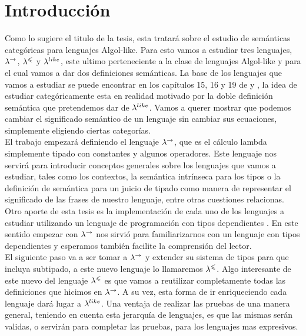 \chapter{Introducci\'on}
\label{chap:intro}

Como lo sugiere el titulo de la tesis, esta tratar\'a sobre el estudio
de sem\'anticas categ\'oricas para lenguajes Algol-like. Para esto
vamos a estudiar tres lenguajes, $\lambda^{\rightarrow}$, $\lambda^{\leqslant}$ y $\lambda^{like}$,
este ultimo perteneciente a la clase de lenguajes Algol-like y para el cual
vamos a dar dos definiciones sem\'anticas.
La base de los lenguajes que vamos a estudiar se puede encontrar en los
cap\'itulos 15, 16 y 19 de \cite{reynolds2009theories} y \cite{olesfunctorcategories}, 
la idea de estudiar
categ\'oricamente esta en realidad motivado por la doble definici\'on
sem\'antica que pretendemos dar de $\lambda^{like}$. Vamos a querer mostrar
que podemos cambiar el significado
sem\'antico de un lenguaje sin cambiar sus ecuaciones, simplemente
eligiendo ciertas categor\'ias.\\

El trabajo empezar\'a definiendo el lenguaje $\lambda^{\rightarrow}$, que es el
c\'alculo lambda simplemente tipado con constantes y algunos operadores.
Este lenguaje nos servir\'a para introducir conceptos generales sobre 
los lenguajes que vamos a estudiar, tales como
los contextos, la sem\'antica intr\'inseca para los tipos o la definici\'on
de sem\'antica para un juicio de tipado como manera de representar el significado
de las frases de nuestro lenguaje, entre otras cuestiones relacionas. 
Otro aporte de esta tesis es la implementaci\'on de cada uno de los lenguajes
a estudiar utilizando un lenguaje de programaci\'on con tipos dependientes 
\cite{idrislanguage}. 
En este sentido empezar con $\lambda^{\rightarrow}$ nos sirvi\'o para
familiarizarnos con un lenguaje con tipos dependientes y esperamos tambi\'en
facilite la comprensi\'on del lector.\\

El siguiente paso va a ser tomar a $\lambda^{\rightarrow}$ y extender su sistema de 
tipos para que incluya subtipado, a este nuevo lenguaje lo llamaremos
$\lambda^{\leqslant}$. Algo interesante de este nuevo del lenguaje $\lambda^{\leqslant}$
es que vamos a reutilizar completamente todas las definiciones que hicimos
en $\lambda^{\rightarrow}$. A su vez, esta forma de ir enriqueciendo cada lenguaje 
dar\'a lugar a $\lambda^{like}$. Una ventaja de realizar las pruebas de una manera 
general, teniendo en cuenta esta jerarqu\'ia de lenguajes, es que las mismas
ser\'an validas, o servir\'an para completar las pruebas, para los
lenguajes mas expresivos.\\

